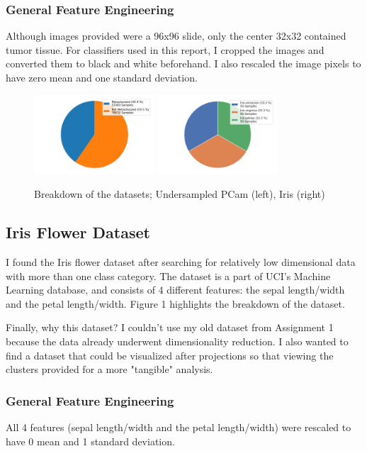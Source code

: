 \documentclass[letter]{article}
\begin{document}
\subsubsection{General Feature Engineering}
Although images provided were a 96x96 slide, only the center 32x32 contained tumor tissue. For classifiers used in this report, I cropped the images and converted them to black and white beforehand. I also rescaled the image pixels to have zero mean and one standard deviation. 

\begin{figure}
  \centering
  \includegraphics[width=0.4\textwidth]{images/pcamDistr.png}
  \includegraphics[width=0.4\textwidth]{images/irisDistr.png}
  \caption{Breakdown of the datasets; Undersampled PCam (left), Iris (right)}
\end{figure}

\subsection{Iris Flower Dataset}

I found the Iris flower dataset after searching for relatively low dimensional data with more than one class category. The dataset is a part of UCI's Machine Learning database\autocite{irisUCI}, and consists of 4 different features: the sepal length/width and the petal length/width.  Figure 1 highlights the breakdown of the dataset.

Finally, why this dataset? I couldn't use my old dataset from Assignment 1 because the data already underwent dimensionality reduction. I also wanted to find a dataset that could be visualized after projections so that viewing the clusters provided for a more "tangible" analysis.

\subsubsection{General Feature Engineering}
All 4 features (sepal length/width and the petal length/width) were rescaled to have 0 mean and 1 standard deviation.
\end{document}
